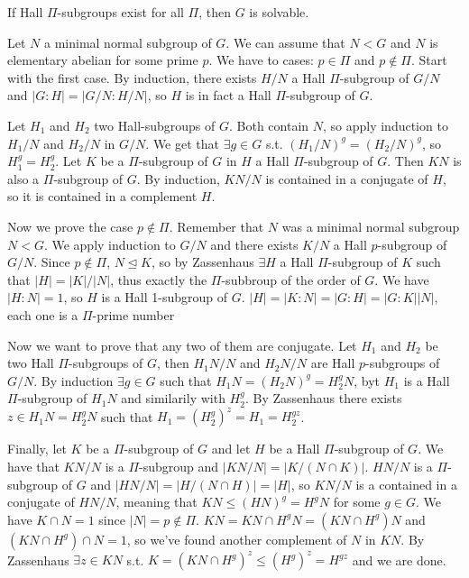 \documentclass[twoside, 11pt]{article}
\begin{document}
\begin{teorema}[Hall]
If Hall $\Pi$-subgroups exist for all $\Pi$, then $G$ is solvable. 
\end{teorema}
\begin{dem}
Let $N$ a minimal normal subgroup of $G$. We can assume that $N<G$ and $N$ is elementary abelian for some prime $p$. We have to cases: $p\in \Pi$ and $p\notin\Pi$. Start with the first case. By induction, there exists $H/N$ a Hall $\Pi$-subgroup of $G/N$ and $|G:H|=|G/N:H/N|$, so $H$ is in fact a Hall $\Pi$-subgroup of $G$.

Let $H_1$ and $H_2$ two Hall-subgroups of $G$. Both contain $N$, so apply induction to $H_1/N$ and $H_2/N$ in $G/N$. We get that $\exists g\in G$ s.t. $(H_1/N)^g=(H_2/N)^g$, so $H_1^g=H_2^g$. Let $K$ be a $\Pi$-subgroup of $G$ in $H$ a Hall $\Pi$-subgroup of $G$. Then $KN$ is also a $\Pi$-subgroup of $G$. By induction, $KN/N$ is contained in a conjugate of $H$, so it is contained in a complement $H$. 

Now we prove the case $p\notin\Pi$. Remember that $N$ was a minimal normal subgroup $N<G$. We apply induction to $G/N$ and there exists $K/N$ a Hall $p$-subgroup of $G/N$. Since $p\notin\Pi$, $N\trianglelefteq K$, so by Zassenhaus $\exists H$ a Hall $\Pi$-subgroup of $K$ such that $|H|=|K|/|N|$, thus exactly the $\Pi$-subbroup of the order of $G$. We have $|H:N|=1$, so $H$ is a Hall 1-subgroup of $G$. $|H|=|K:N|=|G:H|=|G:K||N|$, each one is a $\Pi$-prime number

Now we want to prove that any two of them are conjugate. Let $H_1$ and $H_2$ be two Hall $\Pi$-subgroups of $G$, then $H_1N/N$ and $H_2N/N$ are Hall $p$-subgroups of $G/N$. By induction $\exists g\in G$ such that $H_1N=(H_2N)^g=H_2^gN$, byt $H_1$ is a Hall $\Pi$-subgroup of $H_1N$ and similarily with $H_2^g$. By Zassenhaus there exists $z\in H_1N=H_2^gN$ such that $H_1=(H_2^g)^z=H_1=H_2^{gz}$. 

Finally, let $K$ be a $\Pi$-subgroup of $G$ and let $H$ be a Hall $\Pi$-subgroup of $G$. We have that $KN/N$ is a $\Pi$-subgroup and $|KN/N|=|K/(N\cap K)|$. $HN/N$ is a $\Pi$-subgroup of $G$ and $|HN/N|=|H/(N\cap H)|=|H|$, so $KN/N$ is a contained in a conjugate of $HN/N$, meaning that $KN\leq (HN)^g=H^gN$ for some $g\in G$. We have $K\cap N=1$ since $|N|=p\notin\Pi$. $KN=KN\cap H^gN=(KN\cap H^g)N$ and $(KN\cap H^g)\cap N=1$, so we've found another complement of $N$ in $KN$. By Zassenhaus $\exists z\in KN$ s.t. $K=(KN\cap H^g)^z\leq (H^g)^z=H^{gz}$ and we are done.
\end{dem}
\end{document}
